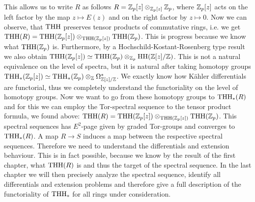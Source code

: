 This allows us to write $R$ as follows $R=\mathbb{Z}_p[z]\otimes_{\mathbb{Z}_p[z]}\mathbb{Z}_p$, where $\mathbb{Z}_p[z]$ acts on the left factor by the map $z\mapsto E(z)$ and on the right factor by $z\mapsto 0$. 
Now we can observe, that $\operatorname{THH}$ preserves tensor products of commutative rings, i.e. we get $\operatorname{THH}(R)=\operatorname{THH}(\mathbb{Z}_p[z])\otimes_{\operatorname{THH}(\mathbb{Z}_p[z])}\operatorname{THH}(\mathbb{Z}_p)$. This is progress because we know what $\operatorname{THH}(\mathbb{Z}_p)$ is. Furthermore, by a Hochschild-Kostant-Rosenberg type result we also obtain $\operatorname{THH}(\mathbb{Z}_p[z])\simeq\operatorname{THH}(\mathbb{Z}_p)\otimes_{\mathbb{Z}_p}\operatorname{HH}(\mathbb{Z}[z]/\mathbb{Z})$. This is not a natural equivalence on the level of spectra, but it is natural after taking homotopy groups $\operatorname{THH}_*(\mathbb{Z}_p[z])\simeq\operatorname{THH}_*(\mathbb{Z}_p)\otimes_{\mathbb{Z}}\Omega^*_{\mathbb{Z}[z]/\mathbb{Z}}$. We exactly know how Kähler differentials are functorial, thus we completely understand the functoriality on the level of homotopy groups. Now we want to go from these homotopy groups to $\operatorname{THH}_*(R)$ and for this we can employ the Tor-spectral sequence to the tensor product formula, we found above: $\operatorname{THH}(R)=\operatorname{THH}(\mathbb{Z}_p[z])\otimes_{\operatorname{THH}(\mathbb{Z}_p[z])}\operatorname{THH}(\mathbb{Z}_p)$. This spectral sequences has $E^2$-page given by graded Tor-groups and converges to $\operatorname{THH}_*(R)$. A map $R\to S$ induces a map between the respective spectral sequences. Therefore we need to understand the differentials and extension behaviour. This is in fact possible, because we know by the result of the first chapter, what $\operatorname{THH}(R)$ is and thus the target of the spectral sequence. In the last chapter we will then precisely analyze the spectral sequence, identify all differentials and extension problems and therefore give a full description of the functoriality of $\operatorname{THH}_*$ for all rings under consideration. 